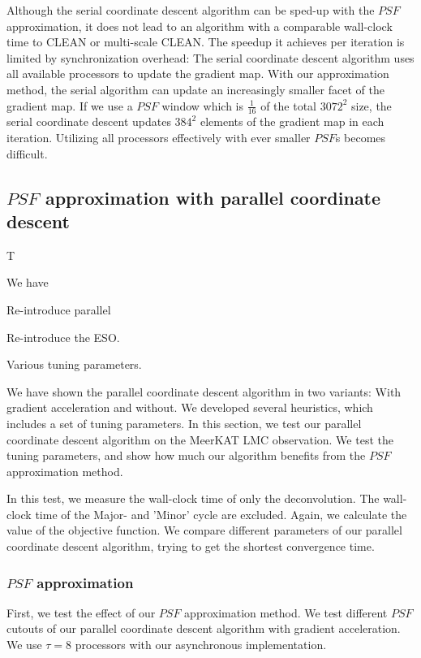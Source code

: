 Although the serial coordinate descent algorithm can be sped-up with the $PSF$ approximation, it does not lead to an algorithm with a comparable wall-clock time to CLEAN or multi-scale CLEAN. The speedup it achieves per iteration is limited by synchronization overhead: The serial coordinate descent algorithm uses all available processors to update the gradient map. With our approximation method, the serial algorithm can update an increasingly smaller facet of the gradient map. If we use a $PSF$ window which is $\frac{1}{16}$ of the total $3072^2$ size, the serial coordinate descent updates $384^2$ elements of the gradient map in each iteration. Utilizing all processors effectively with ever smaller $PSF$s becomes difficult.






\subsection{$PSF$ approximation with parallel coordinate descent}\label{pcdm:results}
T

We have

Re-introduce parallel

Re-introduce the ESO.

Various tuning parameters.



We have shown the parallel coordinate descent algorithm in two variants: With gradient acceleration and without. We developed several heuristics, which includes a set of tuning parameters. In this section, we test our parallel coordinate descent algorithm on the MeerKAT LMC observation. We test the tuning parameters, and show how much our algorithm benefits from the $PSF$ approximation method.

In this test, we measure the wall-clock time of only the deconvolution. The wall-clock time of the Major- and 'Minor' cycle are excluded. Again, we calculate the value of the objective function. We compare different parameters of our parallel coordinate descent algorithm, trying to get the shortest convergence time.

\subsubsection{$PSF$ approximation}
First, we test the effect of our $PSF$ approximation method. We test different $PSF$ cutouts of our parallel coordinate descent algorithm with gradient acceleration. We use $\tau = 8$ processors with our asynchronous implementation.

